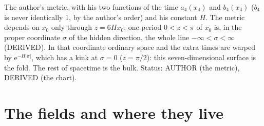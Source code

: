 \documentclass[
  10pt,
]{article}
\begin{document}
The author's metric, with his two functions of the time \(a_4(x_4)\) and
\(b_4(x_4)\) (\(b_4\) is never identically 1, by the author's order) and
his constant \(H\). The metric depends on \(x_0\) only through
\(z = 6Hx_0\); one period \(0 < z < \pi\) of \(x_0\) is, in the proper
coordinate \(\sigma\) of the hidden direction, the whole line
\(-\infty < \sigma < \infty\) (DERIVED). In that coordinate ordinary
space and the extra times are warped by
\(\mathrm{e}^{-H\lvert\sigma\rvert}\), which has a kink at
\(\sigma = 0\) (\(z = \pi/2\)): this seven-dimensional surface is the
fold. The rest of spacetime is the bulk. Status: AUTHOR (the metric),
DERIVED (the chart).

\hypertarget{the-fields-and-where-they-live}{%
\section{The fields and where they
live}\label{the-fields-and-where-they-live}}
\end{document}
